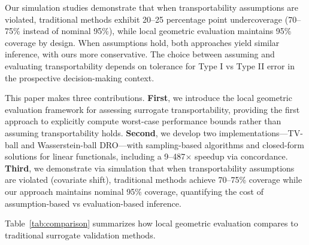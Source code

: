 \documentclass{article}
\begin{document}
Our simulation studies demonstrate that when transportability assumptions are violated, traditional methods exhibit 20--25 percentage point undercoverage (70--75\% instead of nominal 95\%), while local geometric evaluation maintains 95\% coverage by design. When assumptions hold, both approaches yield similar inference, with ours more conservative. The choice between assuming and evaluating transportability depends on tolerance for Type I vs Type II error in the prospective decision-making context.

This paper makes three contributions. \textbf{First}, we introduce the local geometric evaluation framework for assessing surrogate transportability, providing the first approach to explicitly compute worst-case performance bounds rather than assuming transportability holds. \textbf{Second}, we develop two implementations---TV-ball and Wasserstein-ball DRO---with sampling-based algorithms and closed-form solutions for linear functionals, including a 9--487$\times$ speedup via concordance. \textbf{Third}, we demonstrate via simulation that when transportability assumptions are violated (covariate shift), traditional methods achieve 70--75\% coverage while our approach maintains nominal 95\% coverage, quantifying the cost of assumption-based vs evaluation-based inference.

Table~\ref{tab:comparison} summarizes how local geometric evaluation compares to traditional surrogate validation methods.
\end{document}
